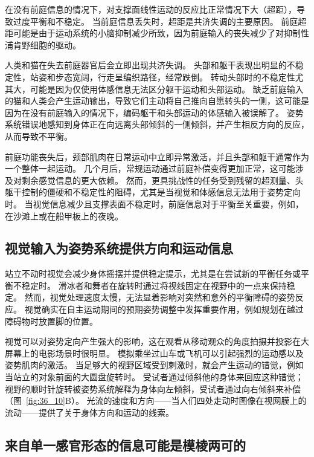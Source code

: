在没有前庭信息的情况下，对支撑面线性运动的反应比正常情况下大（超距），导致过度平衡和不稳定。
当前庭信息丢失时，超距是共济失调的主要原因。
前庭超距可能是由于运动系统的小脑抑制减少所致，因为前庭输入的丧失减少了对抑制性浦肯野细胞的驱动。


人类和猫在失去前庭器官后会立即出现共济失调。
头部和躯干表现出明显的不稳定性，站姿和步态宽阔，行走呈编织路径，经常跌倒。
转动头部时的不稳定性尤其大，可能是因为仅使用体感信息无法区分躯干运动和头部运动。
缺乏前庭输入的猫和人类会产生运动输出，导致它们主动将自己推向自愿转头的一侧，这可能是因为在没有前庭输入的情况下，编码躯干和头部运动的体感输入被误解了。
姿势系统错误地感知到身体正在向远离头部倾斜的一侧倾斜，并产生相反方向的反应，从而导致不平衡。


前庭功能丧失后，颈部肌肉在日常运动中立即异常激活，并且头部和躯干通常作为一个整体一起运动。
几个月后，常规运动通过前庭补偿变得更加正常，这可能涉及对剩余感觉信息的更大依赖。
然而，更具挑战性的任务受到残留的超测量、头躯干控制的僵硬和不稳定性的阻碍，尤其是当视觉和体感信息无法用于姿势定向时。
当视觉信息减少且支撑表面不稳定时，前庭信息对于平衡至关重要，例如，在沙滩上或在船甲板上的夜晚。



\subsection{视觉输入为姿势系统提供方向和运动信息}

站立不动时视觉会减少身体摇摆并提供稳定提示，尤其是在尝试新的平衡任务或平衡不稳定时。
滑冰者和舞者在旋转时通过将视线固定在视野中的一点来保持稳定。
然而，视觉处理速度太慢，无法显着影响对突然和意外的平衡障碍的姿势反应。
视觉确实在自主运动期间的预期姿势调整中发挥重要作用，例如规划在越过障碍物时放置脚的位置。


视觉可以对姿势定向产生强大的影响，这在观看从移动观众的角度拍摄并投影在大屏幕上的电影场景时很明显。
模拟乘坐过山车或飞机可以引起强烈的运动感以及姿势肌肉的激活。
当足够大的视野区域受到刺激时，就会产生运动的错觉，例如当站立的对象前面的大圆盘旋转时。
受试者通过倾斜他的身体来回应这种错觉；
视野的顺时针旋转被姿势系统解释为身体向左倾斜，受试者通过向右倾斜来补偿（图~\ref{fig:36_10}B）。
光流的速度和方向——当人们四处走动时图像在视网膜上的流动——提供了关于身体方向和运动的线索。



\subsection{来自单一感官形态的信息可能是模棱两可的}

